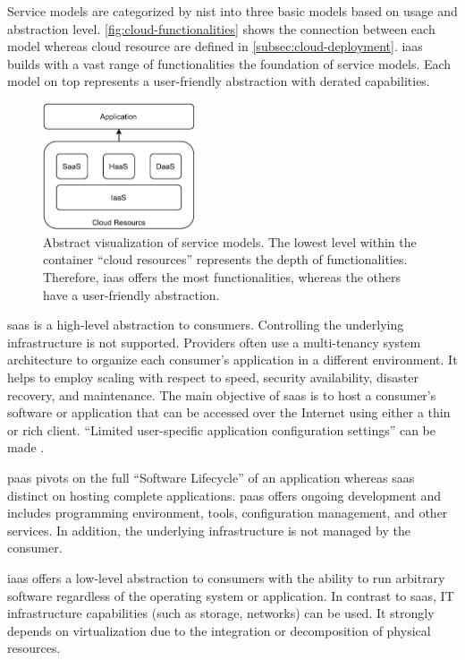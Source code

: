 Service models are categorized by \ac{nist} into three basic models based on usage and abstraction level.
\autoref{fig:cloud-functionalities} shows the connection between each model whereas cloud resource are defined in \autoref{subsec:cloud-deployment}.
\ac*{iaas} builds with a vast range of functionalities the foundation of service models.
Each model on top represents a user-friendly abstraction with derated capabilities.

\begin{figure}
    \centering
    \includegraphics[width=0.4\textwidth]{figures/cloud-service-models.pdf}
    \caption[Abstract visualization of service models]{
        Abstract visualization of service models.
        The lowest level within the container \enquote{cloud resources} represents the depth of functionalities.
        Therefore, \ac{iaas} offers the most functionalities, whereas the others have a user-friendly abstraction.
    }
    \label{fig:cloud-functionalities}
\end{figure}

\ac{saas} is a high-level abstraction to consumers.
Controlling the underlying infrastructure is not supported.
Providers often use a multi-tenancy system architecture to organize each consumer's application in a different environment.
It helps to employ scaling with respect to speed, security availability, disaster recovery, and maintenance.
The main objective of \ac{saas} is to host a consumer's software or application that can be accessed over the Internet using either a thin or rich client. \cite{Dillon2010}
\enquote{Limited user-specific application configuration settings} can be made \cite{Mell2011}.

\ac{paas} pivots on the full \enquote{Software Lifecycle} of an application whereas \ac{saas} distinct on hosting complete applications.
\ac{paas} offers ongoing development and includes programming environment, tools, configuration management, and other services.
In addition, the underlying infrastructure is not managed by the consumer. \cite{Mell2011}

\ac{iaas} offers a low-level abstraction to consumers with the ability to run arbitrary software regardless of the operating system or application.
In contrast to \ac{saas}, IT infrastructure capabilities (such as storage, networks) can be used.
It strongly depends on virtualization due to the integration or decomposition of physical resources. \cite{Mell2011}

